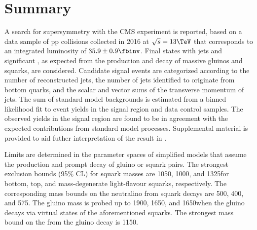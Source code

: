 
\section{Summary}
\label{sec:summary}

A search for supersymmetry with the CMS experiment is reported, based
on a data sample of pp collisions collected in 2016 at $\sqrt{s} =
13\TeV$ that corresponds to an integrated luminosity of $35.9 \pm 0.9
\fbinv$. Final states with jets and significant \ptvecmiss, as
expected from the production and decay of massive gluinos and squarks,
are considered. 
Candidate signal events are categorized according to the number of
reconstructed jets, the number of jets identified to originate from
bottom quarks, and the scalar and vector sums of the transverse
momentum of jets. %
The sum of standard model backgrounds is estimated from a binned
likelihood fit to event yields in the signal region and data control
samples. The observed yields in the signal region are found to be in
agreement with the expected contributions from standard model
processes. Supplemental material is provided to aid futher
interpretation of the result in \suppMaterial.

Limits are determined in the parameter spaces of simplified models
that assume the production and prompt decay of gluino or squark
pairs. The strongest exclusion bounds (95\% CL) for squark masses are
1050, 1000, and 1325\GeV for bottom, top, and mass-degenerate
light-flavour squarks, respectively. The corresponding mass bounds on
the neutralino \PSGczDo from squark decays are 500, 400, and
575\GeV. The gluino mass is probed up to 1900, 1650, and 1650\GeV when
the gluino decays via virtual states of the aforementioned
squarks. The strongest mass bound on the \PSGczDo from the gluino
decay is 1150\GeV.


